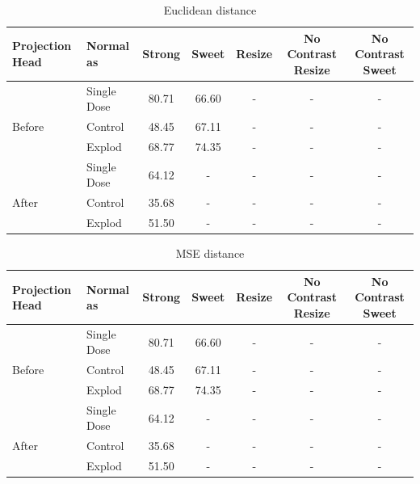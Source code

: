 \begin{table}[H]
  \centering
  \begin{tabular}{@{}llccccc@{}}
  \toprule
  Projection Head & Normal as       & Strong & Sweet & Resize & No Contrast Resize & No Contrast Sweet \\ \midrule
                  & Single Dose    & 80.71      & 66.60     & -      & -                  & -                 \\
  Before          & Control        & 48.45      & 67.11     & -      & -                  & -                 \\
                  & Explod         & 68.77      & 74.35     & -      & -                  & -                 \\ \midrule
                  & Single Dose    & 64.12      & -     & -      & -                  & -                 \\
  After           & Control        & 35.68      & -     & -      & -                  & -                 \\
                  & Explod         & 51.50      & -     & -      & -                  & -                 \\ \bottomrule
  \end{tabular}
  \caption{Euclidean distance}
  \label{tab:table_label}
\end{table}

\begin{table}[H]
  \centering
  \begin{tabular}{@{}llccccc@{}}
  \toprule
  Projection Head & Normal as       & Strong & Sweet & Resize & No Contrast Resize & No Contrast Sweet \\ \midrule
                  & Single Dose    & 80.71      & 66.60     & -      & -                  & -                 \\
  Before          & Control        & 48.45      & 67.11     & -      & -                  & -                 \\
                  & Explod         & 68.77      & 74.35    & -      & -                  & -                 \\ \midrule
                  & Single Dose    & 64.12      & -     & -      & -                  & -                 \\
  After           & Control        & 35.68      & -     & -      & -                  & -                 \\
                  & Explod         & 51.50      & -     & -      & -                  & -                 \\ \bottomrule
  \end{tabular}
  \caption{MSE distance}
  \label{tab:table_label}
\end{table}

